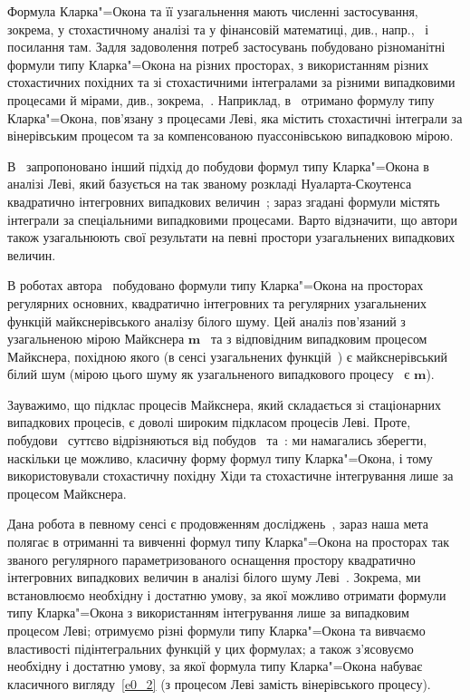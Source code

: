 Формула Кларка"=Окона та її узагальнення мають численні застосування, зокрема, у стохастичному аналізі та у фінансовій математиці, див., напр.,~\cite{KO91,AOPU00,NOP04,PT07,ET08,Os08,MN08,AGR09,NOP09,Zh09} і посилання там.
Задля задоволення потреб застосувань побудовано різноманітні формули типу Кларка"=Окона на різних просторах, з використанням різних стохастичних похідних та зі стохастичними інтегралами за різними випадковими процесами й мірами, див., зокрема,~\cite{KOL91,Lo99,AOPU00,FOS00,BNLOP03,Lo04,NOP04,MN08,Zh09,NOP09,K11c,K11_2c,K12c}.
Наприклад, в~\cite{Lo99,Lo04} отримано формулу типу Кларка"=Окона, пов'язану з процесами Леві, яка містить стохастичні інтеграли за вінерівським процесом та за компенсованою пуассонівською випадковою мірою.

В~\cite{NOP04} запропоновано інший підхід до побудови формул типу Кларка"=Окона в аналізі Леві, який базується на так званому розкладі Нуаларта-Скоутенса квадратично інтегровних випадкових величин~\cite{NS00,S00}; зараз згадані формули містять інтеграли за спеціальними випадковими процесами.
Варто відзначити, що автори~\cite{NOP04} також узагальнюють свої результати на певні простори узагальнених випадкових величин.

В роботах автора~\cite{K11c,K11_2c,K12c} побудовано формули типу Кларка"=Окона на просторах регулярних основних, квадратично інтегровних та регулярних узагальнених функцій майкснерівського аналізу білого шуму.
Цей аналіз пов'язаний з узагальненою мірою Майкснера $\mathbf m$~\cite{R05} та з відповідним випадковим процесом Майкснера, похідною якого (в сенсі узагальнених функцій~\cite{GV61}) є майкснерівський білий шум (мірою цього шуму як узагальненого випадкового процесу~\cite{GS73} є $\mathbf m$).

Зауважимо, що підклас процесів Майкснера, який складається зі стаціонарних випадкових процесів, є доволі широким підкласом процесів Леві. Проте, побудови~\cite{K11c,K11_2c,K12c} суттєво відрізняються від побудов~\cite{Lo99,Lo04} та~\cite{NOP04}: ми намагались зберегти, наскільки це можливо, класичну форму формул типу Кларка"=Окона, і тому використовували стохастичну похідну Хіди та стохастичне інтегрування лише за процесом Майкснера.

Дана робота в певному сенсі є продовженням досліджень~\cite{K11c,K11_2c,K12c}, зараз наша мета полягає в отриманні та вивченні формул типу Кларка"=Окона на просторах так званого регулярного параметризованого оснащення простору квадратично інтегровних випадкових величин в аналізі білого шуму Леві~\cite{K13_2,K21}. Зокрема, ми встановлюємо необхідну і достатню умову, за якої можливо отримати формули типу Кларка"=Окона з використанням інтегрування лише за випадковим процесом Леві; отримуємо різні формули типу Кларка"=Окона та вивчаємо властивості підінтегральних функцій у цих формулах; а також з'ясовуємо необхідну і достатню умову, за якої формула типу Кларка"=Окона набуває класичного вигляду~\eqref{e0_2} (з процесом Леві замість вінерівського процесу).

